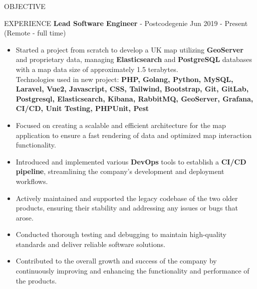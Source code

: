 \documentclass{resume} %
\begin{document}
\begin{rSection}{OBJECTIVE}
\begin{rSection}{EXPERIENCE}
\textbf{Lead Software Engineer} - Postcodegenie \hfill Jun 2019 - Present (Remote - full time)\\
 \begin{itemize}
    \itemsep -3pt {} 
    \item Started a project from scratch to develop a UK map utilizing \textbf{GeoServer} and proprietary data, managing
\textbf{Elasticsearch} and \textbf{PostgreSQL} databases with a map data size of approximately 1.5 terabytes.
\\ Technologies used in new project: \textbf{PHP, Golang, Python, MySQL, Laravel, Vue2, Javascript, CSS, Tailwind, Bootstrap, Git, GitLab, Postgresql, Elasticsearch, Kibana, RabbitMQ, GeoServer, Grafana, CI/CD, Unit Testing, PHPUnit, Pest}
\item Focused on creating a scalable and efficient architecture for the map application to ensure a fast
rendering of data and optimized map interaction functionality.
\item Introduced and implemented various \textbf{DevOps} tools to establish a \textbf{CI/CD pipeline}, streamlining the
company's development and deployment workflows.
\item Actively maintained and supported the legacy codebase of the two older products, ensuring their stability
and addressing any issues or bugs that arose.
\item Conducted thorough testing and debugging to maintain high-quality standards and deliver reliable
software solutions.
\item Contributed to the overall growth and success of the company by continuously improving and enhancing
the functionality and performance of the products.
\\
\\
 \end{itemize}


\end{rSection}
\end{rSection}
\end{document}
